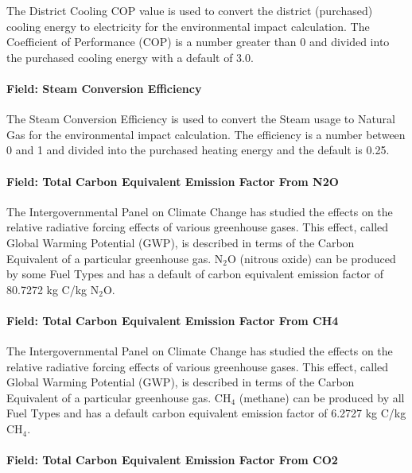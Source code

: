 The District Cooling COP value is used to convert the district (purchased) cooling energy to electricity for the environmental impact calculation. The Coefficient of Performance (COP) is a number greater than 0 and divided into the purchased cooling energy with a default of 3.0.

\paragraph{Field: Steam Conversion Efficiency}\label{field-steam-conversion-efficiency}

The Steam Conversion Efficiency is used to convert the Steam usage to Natural Gas for the environmental impact calculation. The efficiency is a number between 0 and 1 and divided into the purchased heating energy and the default is 0.25.

\paragraph{Field: Total Carbon Equivalent Emission Factor From N2O}\label{field-total-carbon-equivalent-emission-factor-from-n2o}

The Intergovernmental Panel on Climate Change has studied the effects on the relative radiative forcing effects of various greenhouse gases. This effect, called Global Warming Potential (GWP), is described in terms of the Carbon Equivalent of a particular greenhouse gas. N\(_{2}\)O (nitrous oxide) can be produced by some Fuel Types and has a default of carbon equivalent emission factor of 80.7272 kg C/kg N\(_{2}\)O.

\paragraph{Field: Total Carbon Equivalent Emission Factor From CH4}\label{field-total-carbon-equivalent-emission-factor-from-ch4}

The Intergovernmental Panel on Climate Change has studied the effects on the relative radiative forcing effects of various greenhouse gases. This effect, called Global Warming Potential (GWP), is described in terms of the Carbon Equivalent of a particular greenhouse gas. CH\(_{4}\) (methane) can be produced by all Fuel Types and has a default carbon equivalent emission factor of 6.2727 kg C/kg CH\(_{4}\).

\paragraph{Field: Total Carbon Equivalent Emission Factor From CO2}\label{field-total-carbon-equivalent-emission-factor-from-co2}

